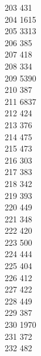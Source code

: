 { 203	431 \\
 204	1615 \\
 205	3313 \\
 206	385 \\
 207	418 \\
 208	334 \\
 209	5390 \\
 210	387 \\
 211	6837 \\
 212	424 \\
 213	376 \\
 214	475 \\
 215	473 \\
 216	303 \\
 217	383 \\
 218	342 \\
 219	393 \\
 220	449 \\
 221	348 \\
 222	420 \\
 223	500 \\
 224	444 \\
 225	404 \\
 226	412 \\
 227	422 \\
 228	449 \\
 229	387 \\
 230	1970 \\
 231	372 \\
 232	482 \\
}

